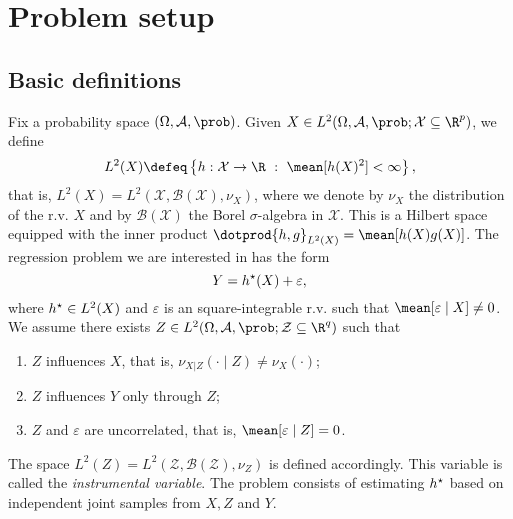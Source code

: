 \section{Problem setup}

\subsection{Basic definitions}

Fix a probability space $ ( \Omega, \mathcal{A}, \prob ) $.
Given $ X \in L^{ 2 } ( \Omega, \mathcal{A}, \prob ; \mathcal{X} \subseteq \R^{ p } ) $, we define
\begin{equation*}
    L^{ 2 } ( X ) \defeq \left\{ h : \mathcal{X} \to \R \ : \ \mean [ h ( X )^2 ] < \infty \right\}
,\end{equation*}
that is, $ L^{ 2 } ( X ) = L^{ 2 } ( \mathcal{X}, \mathcal{B} ( \mathcal{X} ), \nu_{ X } ) $, where we denote by $ \nu_{ X } $ the distribution of the r.v. $ X $ and by $ \mathcal{B} ( \mathcal{X} ) $ the Borel $ \sigma $-algebra in $ \mathcal{X} $.
This is a Hilbert space equipped with the inner product $ \dotprod{ h, g }_{ L^{ 2 } ( X ) } = \mean [ h ( X ) g ( X ) ] $.
The regression problem we are interested in has the form
\begin{equation}
    \label{eq: main problem}
    Y = h^{ \star } (X) + \varepsilon
,\end{equation}
where $ h^{ \star } \in L^{ 2 } ( X ) $ and $ \varepsilon $ is an square-integrable r.v. such that $ \mean [ \varepsilon \mid X ] \neq 0 $.
We assume there exists $ Z \in L^{ 2 } ( \Omega, \mathcal{A}, \prob ; \mathcal{Z} \subseteq \R^{ q } ) $ such that
\begin{enumerate}[label=\roman*)]
    \item $ Z $ influences $ X $, that is, $ \nu_{ X|Z } ( \cdot \mid Z ) \neq \nu_{ X } ( \cdot ) $;
    \item $ Z $ influences $ Y $ only through $ Z $;
    \item $ Z $ and $ \varepsilon $ are uncorrelated, that is, $ \mean [ \varepsilon \mid Z ] = 0 $.
\end{enumerate}
The space $ L^{ 2 } ( Z ) = L^{ 2 } ( \mathcal{Z}, \mathcal{B} ( \mathcal{Z} ), \nu_{ Z } ) $ is defined accordingly.
This variable is called the \emph{instrumental variable}.
The problem consists of estimating $ h^{ \star } $ based on independent joint samples from $ X, Z $ and $ Y $.

